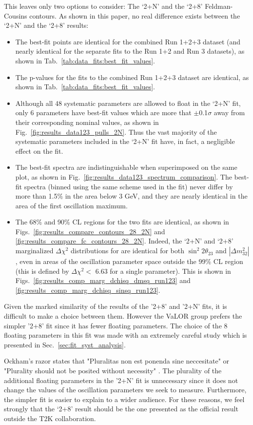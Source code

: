 This leaves only two options to consider: 
The `2+N' and the `2+8' Feldman-Cousins contours.
As shown in this paper, 
no real difference exists between the `2+N' and the `2+8' results:
\begin{itemize}
\item The best-fit points are identical for the combined Run 1+2+3 dataset 
      (and nearly identical for the separate fits to the Run 1+2 and Run 3 datasets),
      as shown in Tab.\ \ref{tab:data_fits:best_fit_values}.
\item The p-values for the fits to the combined Run 1+2+3 dataset are identical,
      as shown in Tab.\ \ref{tab:data_fits:best_fit_values}.
\item Although all 48 systematic parameters are allowed to float in the `2+N' fit,
      only 6 parameters have best-fit values which are more that 
      $\pm$0.1$\sigma$ away from their corresponding nominal values,
      as shown in Fig.\ \ref{fig:results_data123_pulls_2N}.
      Thus the vast majority of the systematic parameters included in the `2+N' fit have,
      in fact, a negligible effect on the fit.
\item The best-fit spectra are indistinguishable when superimposed on the same plot,
      as shown in Fig.\ \ref{fig:results_data123_spectrum_comparison}.
      The best-fit spectra (binned using the same scheme used in the fit) 
      never differ by more than 1.5\% in the area below 3 GeV,
      and they are nearly identical in the area of the first oscillation maximum.
\item The 68\% and 90\% CL regions for the two fits are identical,
      as shown in Figs.\ \ref{fig:results_compare_contours_28_2N} 
      and \ref{fig:results_compare_fc_contours_28_2N}.
      Indeed, the `2+N' and `2+8' marginalized $\Delta\chi^2$ distributions for 
      are identical for both $\sin^{2}{2\theta_{23}}$ and $|\Delta m_{32}^{2}|$, 
      even in areas of the oscillation parameter space outside the 
      99\% CL region (this is defined by $\Delta\chi^2 <$ 6.63 for a single parameter).
      This is shown in Figs.\ 
      \ref{fig:results_comp_marg_dchisq_dmsq_run123} and 
      \ref{fig:results_comp_marg_dchisq_sinsq_run123}.
\end{itemize}

Given the marked similarity of the results of the '2+8' and '2+N' fits, it is difficult to make 
a choice between them. However the VaLOR group prefers the simpler '2+8' fit since it has fewer 
floating parameters. The choice of the 8 floating parameters in this fit was made with an 
extremely careful study which is presented in Sec.\ \ref{sec:fit_syst_analysis}. 

Ockham's razor states that "Pluralitas non est ponenda sine neccesitate" or "Plurality should not be posited 
without necessity" \cite{ockham}. The plurality of the additional floating parameters in the '2+N' fit is unnecessary 
since it does not change the values of the oscillation parameters we seek to measure. Furthermore, the simpler fit 
is easier to explain to a wider audience. For these reasons, we feel strongly that the `2+8' result 
should be the one presented as the official result outside the T2K collaboration.

